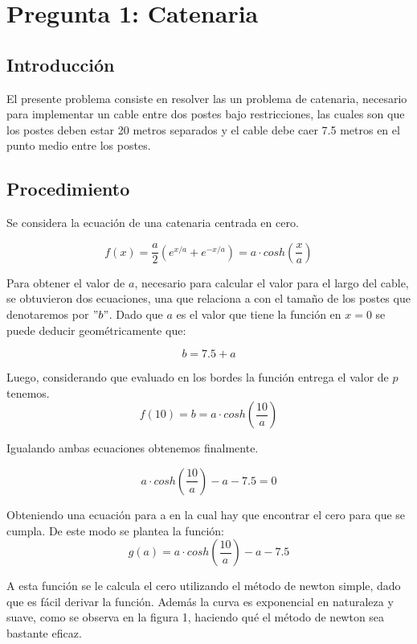 \documentclass[letterpaper,11pt]{article} %
\begin{document}









\section{Pregunta 1: Catenaria}
\subsection{Introducción}
El presente problema consiste en resolver las un problema de catenaria, necesario para implementar un cable entre dos postes bajo restricciones, las cuales son que los postes deben estar 20 metros separados y el cable debe caer 7.5 metros en el punto medio entre los postes.
\subsection{Procedimiento}
Se considera la ecuación de una catenaria centrada en cero.

$$ f(x) = \frac{a}{2} \left( e^{x/a} + e^ {-x/a} \right)=a \cdot cosh(\frac{x}{a}) $$

Para obtener el valor de $a$, necesario para calcular el valor para el largo del cable, se obtuvieron dos ecuaciones, una que relaciona a con el tamaño de los postes que denotaremos por $"b"$. Dado que $a$ es el valor que tiene la función en $x=0$ se puede deducir geométricamente que:

$$b=7.5+a$$

Luego, considerando que evaluado en los bordes la función entrega el valor de $p$ tenemos.
$$f(10)=b=a\cdot cosh(\frac{10}{a})$$

Igualando ambas ecuaciones obtenemos finalmente.

$$a\cdot cosh(\frac{10}{a})-a-7.5=0$$

Obteniendo una ecuación para a en la cual hay que encontrar el cero para que se cumpla. De este modo se plantea la función:
$$g(a)=a\cdot cosh(\frac{10}{a})-a-7.5$$

A esta función se le calcula el cero utilizando el método de newton simple, dado que es fácil derivar la función. Además la curva es exponencial en naturaleza y suave, como se observa en la figura 1, haciendo qué el método de newton sea bastante eficaz.
\end{document}
